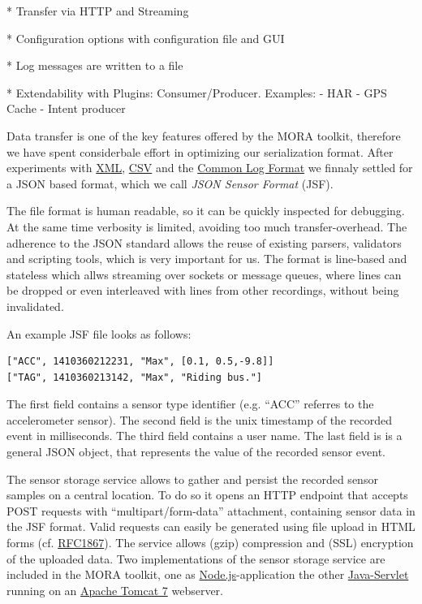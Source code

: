 \documentclass[times, 10pt,twocolumn]{article}
\begin{document}
* Transfer via HTTP and Streaming

* Configuration options with configuration file and GUI

* Log messages are written to a file

* Extendability with Plugins: Consumer/Producer. Examples:
  - HAR
  - GPS Cache
  - Intent producer

Data transfer is one of the key features offered by the MORA toolkit, therefore we have spent considerbale effort in optimizing our serialization format.
After experiments with \href{http://www.w3.org/XML/}{XML}, \href{http://tools.ietf.org/html/rfc4180}{CSV} and the \href{http://en.wikipedia.org/wiki/Common_Log_Format}{Common Log Format} we finnaly settled for a JSON based format, which we call {\em JSON Sensor Format} (JSF).

The file format is human readable, so it can be quickly inspected for debugging. At the same time verbosity is limited, avoiding too much transfer-overhead.
The adherence to the JSON standard allows the reuse of existing parsers, validators and scripting tools, which is very important for us.
The format is line-based and stateless which allws streaming over sockets or message queues, where lines can be dropped or even interleaved with lines from other recordings, without being invalidated.

An example JSF file looks as follows:
\begingroup
\fontsize{9pt}{10pt}\selectfont
\begin{verbatim}
["ACC", 1410360212231, "Max", [0.1, 0.5,-9.8]]
["TAG", 1410360213142, "Max", "Riding bus."]
\end{verbatim}
\endgroup
The first field contains a sensor type identifier (e.g. ``ACC'' referres to the accelerometer sensor). 
The second field is the unix timestamp of the recorded event in milliseconds.
The third field contains a user name.
The last field is is a general JSON object, that represents the value of the recorded sensor event.


The sensor storage service allows to gather and persist the recorded sensor samples on a central location.
To do so it opens an HTTP endpoint that accepts POST requests with ``multipart/form-data'' attachment, containing sensor data in the JSF format.
Valid requests can easily be generated using file upload in HTML forms (cf. \href{https://www.ietf.org/rfc/rfc1867.txt}{RFC1867}).
The service allows (gzip) compression and (SSL) encryption of the uploaded data.
Two implementations of the sensor storage service are included in the MORA toolkit, one as \href{http://nodejs.org}{Node.js}-application the other \href{https://www.jcp.org/en/jsr/detail?id=154}{Java-Servlet} running on an \href{http://tomcat.apache.org/}{Apache Tomcat 7} webserver.
\end{document}

